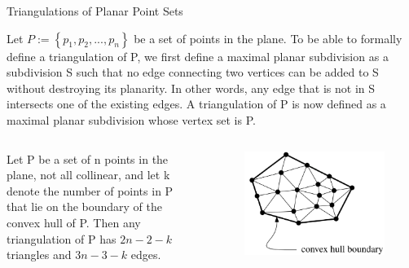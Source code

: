 \begin{frame}{Triangulations of Planar Point Sets \cite{DeBerg2008}}

    Let $P := \left\{p_1, p_2,..., p_n\right\}$ be a set of points in the plane. To be able to formally
    define a triangulation of P, we first define a maximal planar subdivision as
    a subdivision S such that no edge connecting two vertices can be added to
    S without destroying its planarity. In other words, any edge that is not in S
    intersects one of the existing edges. A triangulation of P is now defined as a
    maximal planar subdivision whose vertex set is P.
    \begin{columns}
     Let P be a set of n points in the plane, not all collinear, and let k
denote the number of points in P that lie on the boundary of the convex hull
of P. Then any triangulation of P has $2n - 2 - k$ triangles and $3n-3-k$ edges.
        \begin{figure}
            \centering
            \includegraphics[width=\textwidth]{figs/L07-convex-hull.png}
        \end{figure}
    \end{columns}
\end{frame}


